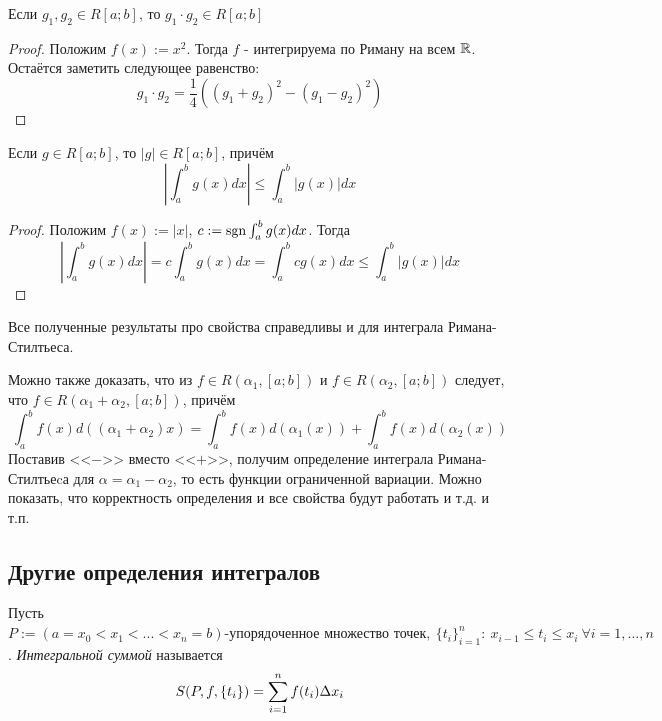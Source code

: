 \begin{corollary}
	Если $g_1, g_2 \in R[a; b]$, то $g_1 \cdot g_2 \in R[a; b]$
\end{corollary}

\begin{proof}
	Положим $f(x) := x^2$. Тогда $f$ - интегрируема по Риману на всем $\mathbb{R}$. Остаётся заметить следующее равенство:
	\[
		g_1 \cdot g_2 = \frac{1}{4}((g_1 + g_2)^2 - (g_1 - g_2)^2)
	\]
\end{proof}

\begin{corollary}
	Если $g \in R[a; b]$, то $|g| \in R[a; b]$, причём
	\[
		\left|\int_a^b g(x)dx\right| \le \int_a^b |g(x)|dx
	\]
\end{corollary}

\begin{proof}
	Положим $f(x) := |x|$, $c := \operatorname{sgn} \int_a^b g(x)dx$. Тогда
	\[
		\left|\int_a^b g(x)dx\right| = c\int_a^b g(x)dx = \int_a^b cg(x)dx \le \int_a^b |g(x)|dx
	\]
\end{proof}

\begin{note}
	Все полученные результаты про свойства справедливы и для интеграла Римана-Стилтьеса.
\end{note}

\begin{note}
	Можно также доказать, что из $f \in R(\alpha_1, [a; b])$ и $f \in R(\alpha_2, [a; b])$ следует, что $f \in R(\alpha_1 + \alpha_2, [a; b])$, причём
	\[
		\int_a^b f(x) d((\alpha_1 + \alpha_2)x) = \int_a^b f(x) d(\alpha_1(x)) + \int_a^b f(x)d(\alpha_2(x))
	\]
	Поставив <<$-$>> вместо <<$+$>>, получим определение интеграла Римана-Стилтьеcа для $\alpha = \alpha_1 - \alpha_2$, то есть функции ограниченной вариации. Можно показать, что корректность определения и все свойства будут работать и т.д. и т.п.
\end{note}

\subsection{Другие определения интегралов}

\begin{definition}
	Пусть $P:= (a=x_0<x_1<...<x_n=b)\text{-упорядоченное множество точек},\ \{t_i\}_{i=1}^n:\ x_{i-1} \leq t_i\leq x_i\ \forall i=1,..., n$ . \textit{Интегральной суммой} называется 
	\[
		S(P, f, \{t_i\})=\sum\limits_{i = 1}^n f(t_i) \Delta x_i
	\]
\end{definition}

